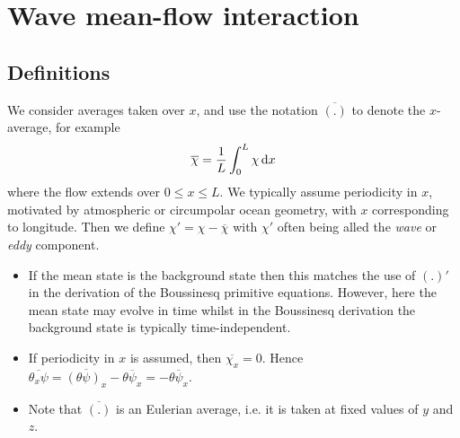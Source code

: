 \documentclass{jknotes}
\begin{document}
\begin{center}
\end{center}
		
\section{Wave mean-flow interaction}

\subsection{Definitions}
We consider averages taken over $x$, and use the notation $\overline{(.)}$ to
denote the $x$-average, for example
\begin{equation}
	\overline{\chi} = \frac{1}{L} \int_0^L \chi \, \diffd x
\end{equation}
where the flow extends over $ 0 \le x \le L$. We typically assume periodicity
in $x$, motivated by atmospheric or circumpolar ocean geometry, with $x$
corresponding to longitude. Then we define $\chi' = \chi - \overline{\chi}$
with $\chi'$ often being alled the \emph{wave} or \emph{eddy} component. 
\begin{itemize}
	\item If the mean state is the background state then this matches the use
		of $(.)'$ in the derivation of the Boussinesq primitive equations.
		However, here the mean state may evolve in time whilst in the
		Boussinesq derivation the background state is typically
		time-independent.

	\item If periodicity in $x$ is assumed, then $\overline{\chi_x} = 0$.
		Hence $\overline{\theta_x \psi} = \overline{(\theta \psi)_x} -
		\overline{\theta \psi_x} = -\overline{\theta \psi_x}$. 

	\item Note that $\overline{(.)}$ is an Eulerian average, i.e. it is taken
		at fixed values of $y$ and $z$.
\end{itemize}
\end{document}
